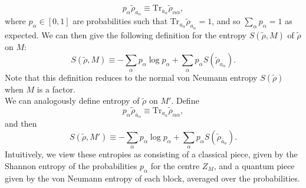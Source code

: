 \documentclass[12pt,a4paper]{report}
\numberwithin{equation}{section}
\newcommand{\ol}[1]{\overline{#1}}
\theoremstyle{definition}
\theoremstyle{theorem}
\theoremstyle{theorem}
\theoremstyle{example}
\theoremstyle{definition}
\begin{document}
\begin{equation}
	p_{\alpha}\tilde{\rho}_{a_{\alpha}}\equiv\text{Tr}_{\ol{a}_{\alpha}}\tilde{\rho}_{\alpha\alpha},
\end{equation}
where $p_{\alpha}\in[0,1]$ are probabilities such that $\text{Tr}_{a_{\alpha}}\tilde{\rho}_{a_{\alpha}}=1$, and so $\sum_{\alpha}p_{\alpha}=1$ as expected. We can then give the following definition for the entropy $S(\tilde{\rho},M)$ of $\tilde{\rho}$ on $M$:
\begin{equation}
	S(\tilde{\rho},M)\equiv -\sum_{\alpha}p_{\alpha}\log{p_{\alpha}}+\sum_{\alpha}p_{\alpha}S(\tilde{\rho}_{a_{\alpha}}).
\end{equation}
Note that this definition reduces to the normal von Neumann entropy $S(\tilde{\rho})$ when $M$ is a factor.\\
We can analogously define entropy of $\tilde{\rho}$ on $M'$. Define
\begin{equation}
	p_{\alpha}\tilde{\rho}_{\ol{a}_{\alpha}}\equiv\text{Tr}_{a_{\alpha}}\tilde{\rho}_{\alpha\alpha},
\end{equation} 
and then
\begin{equation}
	S(\tilde{\rho},M')\equiv-\sum_{\alpha}p_{\alpha}\log{p_{\alpha}}+\sum_{\alpha}p_{\alpha}S(\tilde{\rho}_{\ol{a}_{\alpha}}).
\end{equation}
Intuitively, we view these entropies as consisting of a classical piece, given by the Shannon entropy of the probabilities $p_{\alpha}$ for the centre $Z_{M}$, and a quantum piece given by the von Neumann entropy of each block, averaged over the probabilities.
\end{document}
